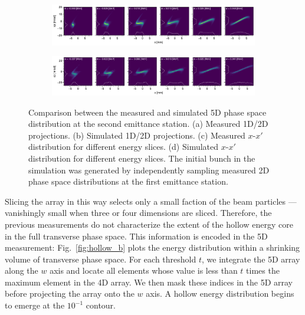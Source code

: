 \documentclass[letterpaper,
               keeplastbox,
               nospread,
               biblatex,
              ]{jacow}
\begin{document}
\begin{figure}[!t]
\begin{subfigure}{0.48\textwidth}
        \caption{}
        \label{fig:VS34_b}
    \end{subfigure}
    \vfill
    \vfill
    \begin{subfigure}{\textwidth}
        \includegraphics[width=\textwidth]{VS34_energy_slice.pdf}
        \caption{}
        \label{fig:VS34_c}
    \end{subfigure}
    \vfill
    \vfill
    \begin{subfigure}{\textwidth}
        \includegraphics[width=\textwidth]{VS34_energy_slice_sim.png}
        \caption{}
        \label{fig:VS34_d}
    \end{subfigure}
    \caption{Comparison between the measured and simulated 5D phase space distribution at the second emittance station. (a) Measured 1D/2D projections. (b) Simulated 1D/2D projections. (c) Measured $x$-$x'$ distribution for different energy slices. (d) Simulated $x$-$x'$ distribution for different energy slices. The initial bunch in the simulation was generated by independently sampling measured 2D phase space distributions at the first emittance station.}
    \label{fig:VS34}
\end{figure}
%

Slicing the array in this way selects only a small faction of the beam particles — vanishingly small when three or four dimensions are sliced. Therefore, the previous measurements do not characterize the extent of the hollow energy core in the full transverse phase space. This information is encoded in the 5D measurement: Fig.~\ref{fig:hollow_b} plots the energy distribution within a shrinking volume of transverse phase space. For each threshold $t$, we integrate the 5D array along the $w$ axis and locate all elements whose value is less than $t$ times the maximum element in the 4D array. We then mask these indices in the 5D array before projecting the array onto the $w$ axis. A hollow energy distribution begins to emerge at the $10^{-1}$ contour.
\end{document}

